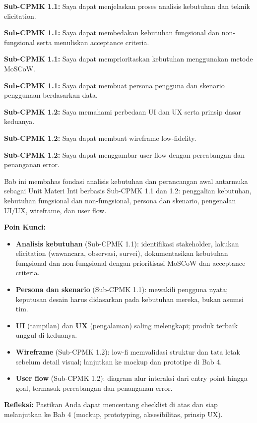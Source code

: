 \documentclass[../main.tex]{subfiles}
\begin{document}
\begin{checklist}
  \item \textbf{Sub-CPMK 1.1:} Saya dapat menjelaskan proses analisis kebutuhan dan teknik elicitation.
  \item \textbf{Sub-CPMK 1.1:} Saya dapat membedakan kebutuhan fungsional dan non-fungsional serta menuliskan acceptance criteria.
  \item \textbf{Sub-CPMK 1.1:} Saya dapat memprioritaskan kebutuhan menggunakan metode MoSCoW.
  \item \textbf{Sub-CPMK 1.1:} Saya dapat membuat persona pengguna dan skenario penggunaan berdasarkan data.
  \item \textbf{Sub-CPMK 1.2:} Saya memahami perbedaan UI dan UX serta prinsip dasar keduanya.
  \item \textbf{Sub-CPMK 1.2:} Saya dapat membuat wireframe low-fidelity.
  \item \textbf{Sub-CPMK 1.2:} Saya dapat menggambar user flow dengan percabangan dan penanganan error.
\end{checklist}

\begin{rangkuman}
Bab ini membahas fondasi analisis kebutuhan dan perancangan awal antarmuka sebagai Unit Materi Inti berbasis Sub-CPMK 1.1 dan 1.2: penggalian kebutuhan, kebutuhan fungsional dan non-fungsional, persona dan skenario, pengenalan UI/UX, wireframe, dan user flow.

\textbf{Poin Kunci:}
\begin{itemize}
  \item \textbf{Analisis kebutuhan} (Sub-CPMK 1.1): identifikasi stakeholder, lakukan elicitation (wawancara, observasi, survei), dokumentasikan kebutuhan fungsional dan non-fungsional dengan prioritisasi MoSCoW dan acceptance criteria.
  \item \textbf{Persona dan skenario} (Sub-CPMK 1.1): mewakili pengguna nyata; keputusan desain harus didasarkan pada kebutuhan mereka, bukan asumsi tim.
  \item \textbf{UI} (tampilan) dan \textbf{UX} (pengalaman) saling melengkapi; produk terbaik unggul di keduanya.
  \item \textbf{Wireframe} (Sub-CPMK 1.2): low-fi memvalidasi struktur dan tata letak sebelum detail visual; lanjutkan ke mockup dan prototipe di Bab 4.
  \item \textbf{User flow} (Sub-CPMK 1.2): diagram alur interaksi dari entry point hingga goal, termasuk percabangan dan penanganan error.
\end{itemize}

\textbf{Refleksi:} Pastikan Anda dapat mencentang checklist di atas dan siap melanjutkan ke Bab 4 (mockup, prototyping, aksesibilitas, prinsip UX).
\end{rangkuman}

\ifSubfilesClassLoaded{
  \renewcommand{\bibname}{Daftar Pustaka}
  
  
}{}
\end{document}
